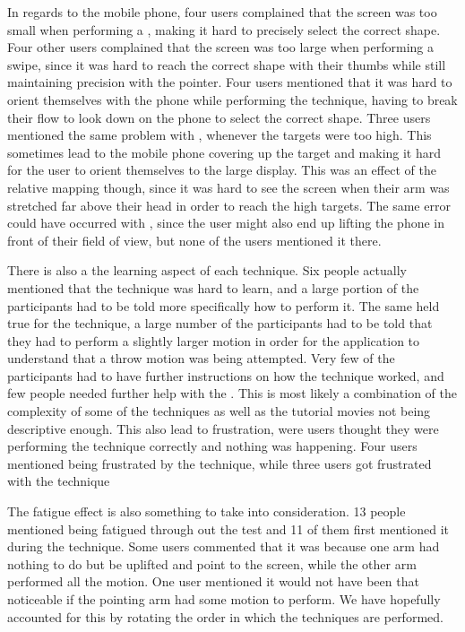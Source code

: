 In regards to the mobile phone, four users complained that the screen was too small when performing a \pinch, making it hard to precisely select the correct shape.
Four other users complained that the screen was too large when performing a swipe, since it was hard to reach the correct shape with their thumbs while still maintaining precision with the pointer. 
Four users mentioned that it was hard to orient themselves with the phone while performing the \throw technique, having to break their flow to look down on the phone to select the correct shape. 
Three users mentioned the same problem with \swipe, whenever the targets were too high.
This sometimes lead to the mobile phone covering up the target and making it hard for the user to orient themselves to the large display. 
This was an effect of the relative mapping though, since it was hard to see the screen when their arm was stretched far above their head in order to reach the high targets.
The same error could have occurred with \tilt, since the user might also end up lifting the phone in front of their field of view, but none of the users mentioned it there.  

There is also a the learning aspect of each technique. Six people actually mentioned that the \pinch technique was hard to learn, and a large portion of the participants had to be told more specifically how to perform it. 
The same held true for the \throw technique, a large number of the participants had to be told that they had to perform a slightly larger motion in order for the application to understand that a throw motion was being attempted.
Very few of the participants had to have further instructions on how the \swipe technique worked, and few people needed further help with the \tilt. 
This is most likely a combination of the complexity of some of the techniques as well as the tutorial movies not being descriptive enough. 
This also lead to frustration, were users thought they were performing the technique correctly and nothing was happening. 
Four users mentioned being frustrated by the \pinch technique, while three users got frustrated with the \tilt technique

The fatigue effect is also something to take into consideration. 13 people mentioned being fatigued through out the test and 11 of them first mentioned it during the \throw technique.
Some users commented that it was because one arm had nothing to do but be uplifted and point to the screen, while the other arm performed all the motion.
One user mentioned it would not have been that noticeable if the pointing arm had some motion to perform.
We have hopefully accounted for this by rotating the order in which the techniques are performed. 


